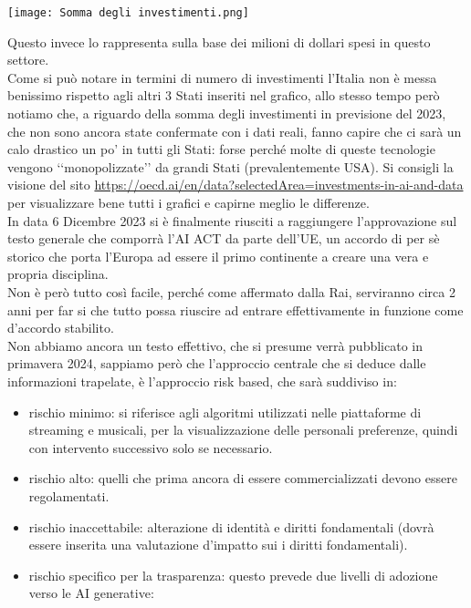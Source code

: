 \documentclass{article}
\begin{document}
\begin{center}
    \texttt{[image: Somma degli investimenti.png]}
\end{center}
\begin{justify}
    Questo invece lo rappresenta sulla base dei milioni di dollari spesi in questo settore.\citep{OECD_AI2}\\
    Come si può notare in termini di numero di investimenti l'Italia non è messa benissimo rispetto agli altri 3 Stati inseriti nel grafico, allo stesso tempo però notiamo che, a riguardo della somma degli investimenti in previsione del 2023, che non sono ancora state confermate con i dati reali, fanno capire che ci sarà un calo drastico un po' in tutti gli Stati: forse perché molte di queste tecnologie vengono ‘‘monopolizzate’’ da grandi Stati (prevalentemente USA).
    Si consigli la visione del sito \url{https://oecd.ai/en/data?selectedArea=investments-in-ai-and-data} per visualizzare bene tutti i grafici e capirne meglio le differenze.\\
    In data 6 Dicembre 2023 si è finalmente riusciti a raggiungere l'approvazione sul testo generale che comporrà l'AI ACT da parte dell'UE, un accordo di per sè storico che porta l'Europa ad essere il primo continente a creare una vera e propria disciplina.\\
    Non è però tutto così facile, perché come affermato dalla Rai, serviranno circa 2 anni per far si che tutto possa riuscire ad entrare effettivamente in funzione come d'accordo stabilito.\citep{PA_Digitale_AI}\\
    Non abbiamo ancora un testo effettivo, che si presume verrà pubblicato in primavera 2024, sappiamo però che l'approccio centrale che si deduce dalle informazioni trapelate, è l'approccio risk based, che sarà suddiviso in:
    \begin{itemize}
        \item rischio minimo: si riferisce agli algoritmi utilizzati nelle piattaforme di streaming e musicali, per la visualizzazione delle personali preferenze, quindi con intervento successivo solo se necessario.
        \item rischio alto: quelli che prima ancora di essere commercializzati devono essere regolamentati.
        \item rischio inaccettabile: alterazione di identità e diritti fondamentali (dovrà essere inserita una valutazione d'impatto sui i diritti fondamentali).
        \item rischio specifico per la trasparenza: questo prevede due livelli di adozione verso le AI generative:

\end{itemize}
\end{justify}
\end{document}
